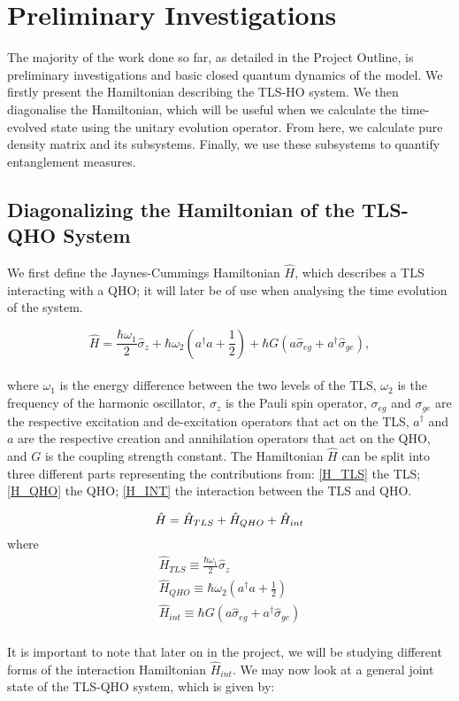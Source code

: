 \documentclass[12pt,a4paper]{article}
\begin{document}
{\section{Preliminary Investigations}}
The majority of the work done so far, as detailed in the Project Outline, is preliminary investigations and basic closed quantum dynamics of the model. We firstly present the Hamiltonian describing the TLS-HO system. We then diagonalise the Hamiltonian, which will be useful when we calculate the time-evolved state using the unitary evolution operator. From here, we calculate pure density matrix and its subsystems. Finally, we use these subsystems to quantify entanglement measures. 
\\
\subsection{\normalsize{Diagonalizing the Hamiltonian of the TLS-QHO System}}

We first define the Jaynes-Cummings\cite{H_JC_friction} Hamiltonian\cite{C_spin-boson} $\hat{H}$, which describes a TLS interacting with a QHO; it will later be of use when analysing the time evolution of the system. 

\begin{equation}
    \hat{H} = \frac{\hbar\omega_1}{2}\hat{\sigma}_z + \hbar\omega_2(a^\dagger a + \frac{1}{2}) + \hbar G(a\hat{\sigma}_{eg} + a^\dagger\hat{\sigma}_{ge}),
\end{equation}
\\
where $\omega_1$ is the energy difference between the two levels of the TLS, $\omega_2$ is the frequency of the harmonic oscillator, $\sigma_z$ is the Pauli spin operator, $\sigma_{eg}$ and $\sigma_{ge}$ are the respective excitation and de-excitation operators that act on the TLS, $a^\dagger$ and $a$ are the respective creation and annihilation operators that act on the QHO, and $G$ is the coupling strength constant. The Hamiltonian $\hat{H}$ can be split into three different parts representing the contributions from: \eqref{H_TLS} the TLS; \eqref{H_QHO} the QHO; \eqref{H_INT} the interaction between the TLS and QHO. 

\begin{equation*}
    \hat{H} = \hat{H}_{TLS} + \hat{H}_{QHO} + \hat{H}_{int}\\
\end{equation*}
where 
\begin{align}
    \hat{H}_{TLS}\equiv \frac{\hbar\omega_1}{2}\hat{\sigma}_z\label{H_TLS}\\
    \hat{H}_{QHO}\equiv \hbar\omega_2(a^\dagger a + \frac{1}{2})\label{H_QHO}\\
    \hat{H}_{int} \equiv\hbar G(a\hat{\sigma}_{eg} + a^\dagger\hat{\sigma}_{ge})\label{H_INT}
\end{align}
\\
It is important to note that later on in the project, we will be studying different forms of the interaction Hamiltonian $\hat{H}_{int}$.
We may now look at a general joint state of the TLS-QHO system, which is given by:
\end{document}
